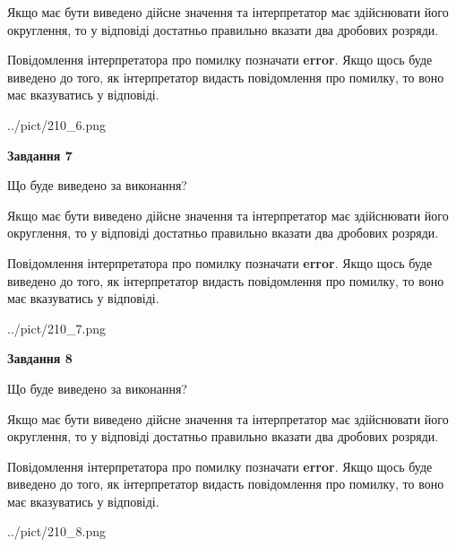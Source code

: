 \documentclass[12pt, ukrainian]{article}
\begin{document}
{\begin {Large}
Якщо має бути виведено дійсне значення та інтерпретатор має здійснювати його округлення, 
то у відповіді достатньо правильно вказати два дробових розряди.

Повідомлення інтерпретатора про помилку позначати \textbf{error}.
Якщо щось буде виведено до того, як інтерпретатор видасть повідомлення про помилку, 
то воно має вказуватись у відповіді. \par

\begin{center}
	{../pict/210_6.png}
\end{center}
\newpage

{\begin {center}\textbf{Завдання 7}\end {center}}\par
Що буде виведено за виконання? \par

Якщо має бути виведено дійсне значення та інтерпретатор має здійснювати його округлення, 
то у відповіді достатньо правильно вказати два дробових розряди.

Повідомлення інтерпретатора про помилку позначати \textbf{error}.
Якщо щось буде виведено до того, як інтерпретатор видасть повідомлення про помилку, 
то воно має вказуватись у відповіді. \par

\begin{center}
	{../pict/210_7.png}
\end{center}
\newpage

{\begin {center}\textbf{Завдання 8}\end {center}}\par
Що буде виведено за виконання? \par

Якщо має бути виведено дійсне значення та інтерпретатор має здійснювати його округлення, 
то у відповіді достатньо правильно вказати два дробових розряди.

Повідомлення інтерпретатора про помилку позначати \textbf{error}.
Якщо щось буде виведено до того, як інтерпретатор видасть повідомлення про помилку, 
то воно має вказуватись у відповіді. \par

\begin{center}
	{../pict/210_8.png}
\end{center}
\newpage


\end{Large}}
\end{document}

